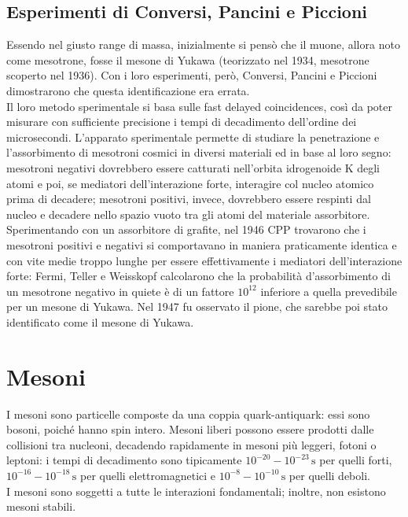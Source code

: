 \subsection{Esperimenti di Conversi, Pancini e Piccioni}

Essendo nel giusto range di massa, inizialmente si pensò che il muone, allora noto come mesotrone, fosse il mesone di Yukawa (teorizzato nel 1934, mesotrone scoperto nel 1936). Con i loro esperimenti, però, Conversi, Pancini e Piccioni dimostrarono che questa identificazione era errata.\\
Il loro metodo sperimentale si basa sulle fast delayed coincidences, così da poter misurare con sufficiente precisione i tempi di decadimento dell'ordine dei microsecondi. L'apparato sperimentale permette di studiare la penetrazione e l'assorbimento di mesotroni cosmici in diversi materiali ed in base al loro segno: mesotroni negativi dovrebbero essere catturati nell'orbita idrogenoide K degli atomi e poi, se mediatori dell'interazione forte, interagire col nucleo atomico prima di decadere; mesotroni positivi, invece, dovrebbero essere respinti dal nucleo e decadere nello spazio vuoto tra gli atomi del materiale assorbitore.\\
Sperimentando con un assorbitore di grafite, nel 1946 CPP trovarono che i mesotroni positivi e negativi si comportavano in maniera praticamente identica e con vite medie troppo lunghe per essere effettivamente i mediatori dell'interazione forte: Fermi, Teller e Weisskopf calcolarono che la probabilità d'assorbimento di un mesotrone negativo in quiete è di un fattore $ 10^{12} $ inferiore a quella prevedibile per un mesone di Yukawa. Nel 1947 fu osservato il pione, che sarebbe poi stato identificato come il mesone di Yukawa.

\section{Mesoni}

I mesoni sono particelle composte da una coppia quark-antiquark: essi sono bosoni, poiché hanno spin intero. Mesoni liberi possono essere prodotti dalle collisioni tra nucleoni, decadendo rapidamente in mesoni più leggeri, fotoni o leptoni: i tempi di decadimento sono tipicamente $ 10^{-20} - 10^{-23}\,\text{s} $ per quelli forti, $ 10^{-16} - 10^{-18}\,\text{s} $ per quelli elettromagnetici e $ 10^{-8} - 10^{-10}\,\text{s} $ per quelli deboli.\\
I mesoni sono soggetti a tutte le interazioni fondamentali; inoltre, non esistono mesoni stabili.

